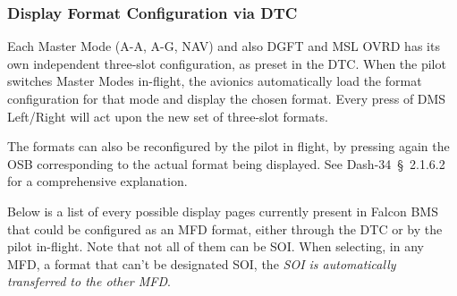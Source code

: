 \documentclass[11pt, a4paper, twoside]{report}
\providecommand{\dashref}[1]{Dash-34~\S~#1}
\begin{document}
\subsubsection{Display Format Configuration via DTC}
\label{sec:C3-S4-S2-S1}

Each Master Mode (A-A, A-G, NAV) and also DGFT and MSL OVRD has its own independent three-slot configuration, as preset in the DTC. When the pilot switches Master Modes in-flight, the avionics automatically load the format configuration for that mode and display the chosen format. Every press of DMS Left/Right will act upon the new set of three-slot formats.

The formats can also be reconfigured by the pilot in flight, by pressing again the OSB corresponding to the actual format being displayed. See \dashref{2.1.6.2} for a comprehensive explanation.

Below is a list of every possible display pages currently present in Falcon BMS that could be configured as an MFD format, either through the DTC or by the pilot in-flight. Note that not all of them can be SOI. When selecting, in any MFD, a format that can't be designated SOI, the \textit{SOI is automatically transferred to the other MFD}.

\small
\renewcommand{\arraystretch}{1.2}
\end{document}

